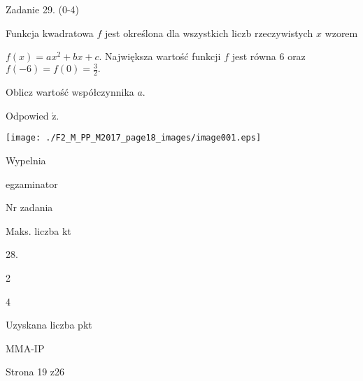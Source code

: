\documentclass[a4paper,12pt]{article}
\begin{document}
Zadanie 29. (0-4)

Funkcja kwadratowa $f$ jest określona dla wszystkich liczb rzeczywistych $x$ wzorem

$f(x)=ax^{2}+bx+c$. Największa wartość funkcji $f$ jest równa 6 oraz $f(-6)=f(0)=\displaystyle \frac{3}{2}.$

Oblicz wartość współczynnika $a.$

Odpowied $\acute{\mathrm{z}}.$
\begin{center}
\texttt{[image: ./F2\_M\_PP\_M2017\_page18\_images/image001.eps]}
\end{center}
Wypelnia

egzaminator

Nr zadania

Maks. liczba kt

28.

2

4

Uzyskana liczba pkt

MMA-IP

Strona 19 z26
\end{document}
